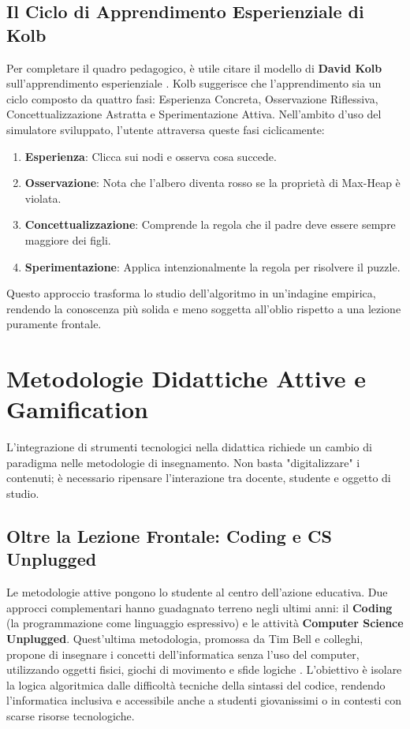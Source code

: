 \documentclass[openany]{theme/uniprthesis}
\begin{document}
\subsection{Il Ciclo di Apprendimento Esperienziale di Kolb}
Per completare il quadro pedagogico, è utile citare il modello di \textbf{David Kolb} sull'apprendimento esperienziale \cite{kolb1984experiential}. Kolb suggerisce che l'apprendimento sia un ciclo composto da quattro fasi: Esperienza Concreta, Osservazione Riflessiva, Concettualizzazione Astratta e Sperimentazione Attiva. 
Nell'ambito d'uso del simulatore sviluppato, l'utente attraversa queste fasi ciclicamente:
\begin{enumerate}
    \item \textbf{Esperienza}: Clicca sui nodi e osserva cosa succede.
    \item \textbf{Osservazione}: Nota che l'albero diventa rosso se la proprietà di Max-Heap è violata.
    \item \textbf{Concettualizzazione}: Comprende la regola che il padre deve essere sempre maggiore dei figli.
    \item \textbf{Sperimentazione}: Applica intenzionalmente la regola per risolvere il puzzle.
\end{enumerate}
Questo approccio trasforma lo studio dell'algoritmo in un'indagine empirica, rendendo la conoscenza più solida e meno soggetta all'oblio rispetto a una lezione puramente frontale.

\section{Metodologie Didattiche Attive e Gamification}
L'integrazione di strumenti tecnologici nella didattica richiede un cambio di paradigma nelle metodologie di insegnamento. Non basta "digitalizzare" i contenuti; è necessario ripensare l'interazione tra docente, studente e oggetto di studio.

\subsection{Oltre la Lezione Frontale: Coding e CS Unplugged}
Le metodologie attive pongono lo studente al centro dell'azione educativa. Due approcci complementari hanno guadagnato terreno negli ultimi anni: il \textbf{Coding} (la programmazione come linguaggio espressivo) e le attività \textbf{Computer Science Unplugged}. Quest'ultima metodologia, promossa da Tim Bell e colleghi, propone di insegnare i concetti dell'informatica senza l'uso del computer, utilizzando oggetti fisici, giochi di movimento e sfide logiche \cite{csunplugged}. L'obiettivo è isolare la logica algoritmica dalle difficoltà tecniche della sintassi del codice, rendendo l'informatica inclusiva e accessibile anche a studenti giovanissimi o in contesti con scarse risorse tecnologiche.
\end{document}
